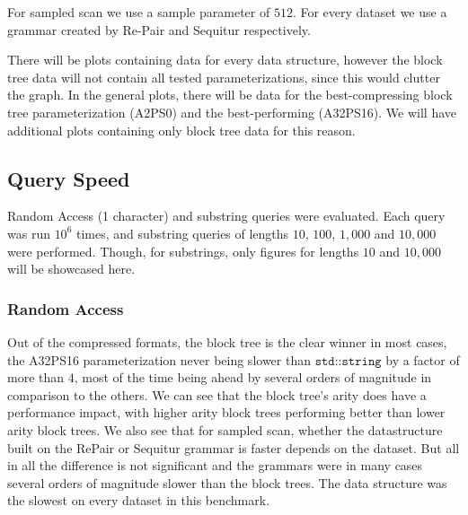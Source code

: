 \documentclass{scrartcl}
\begin{document}
For sampled scan we use a sample parameter of $512$.
For every dataset we use a grammar created by Re-Pair \cite{larsson_off-line_2000} and Sequitur \cite{nevill-manning_identifying_1997} respectively.

There will be plots containing data for every data structure, however the block tree data will not contain all tested parameterizations, since this would clutter the graph.
In the general plots, there will be data for the best-compressing block tree parameterization (A2PS0) and the best-performing (A32PS16).
We will have additional plots containing only block tree data for this reason.


\subsection{Query Speed}

Random Access (1 character) and substring queries were evaluated.
Each query was run $10^6$ times, and substring queries of lengths $10$, $100$, $1,000$ and $10,000$ were performed.
Though, for substrings, only figures for lengths $10$ and $10,000$ will be showcased here.

\subsubsection{Random Access}

Out of the compressed formats, the block tree is the clear winner in most cases, the A32PS16 parameterization never being slower than $\texttt{std::string}$ by a factor of more than $4$,
most of the time being ahead by several orders of magnitude in comparison to the others.
We can see that the block tree's arity does have a performance impact, with higher arity block trees performing better than lower arity block trees.
We also see that for sampled scan, whether the datastructure built on the RePair or Sequitur grammar is faster depends on the dataset.
But all in all the difference is not significant and the grammars were in many cases several orders of magnitude slower than the block trees.
The \lzend{} data structure was the slowest on every dataset in this benchmark.
\end{document}
